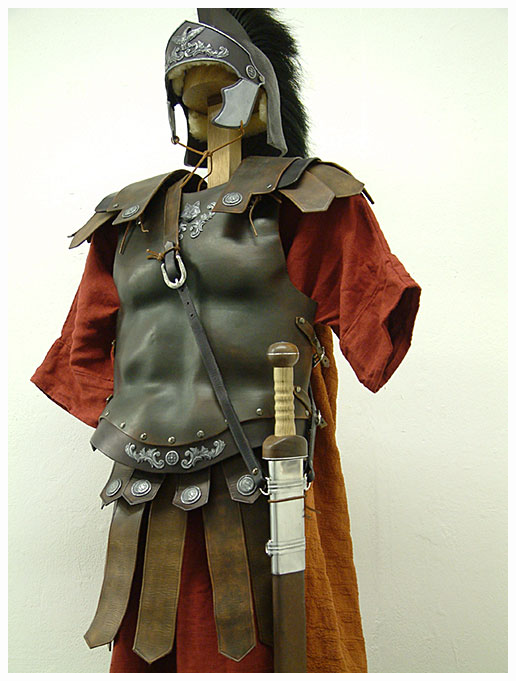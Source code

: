 \documentclass[xcolor=table,serif]{beamer}
\begin{document}
\begin{frame}
\begin{columns}
	\centerline{\includegraphics[scale=0.09]{roman_armour.jpg}}


\end{columns}
\end{frame}
\end{document}
